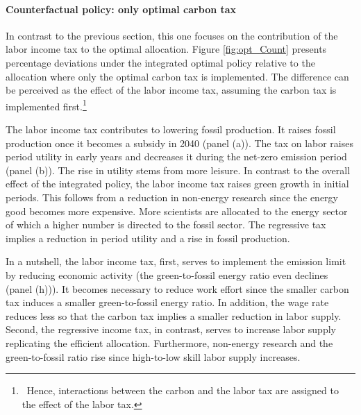 \paragraph{Counterfactual policy: only optimal carbon tax}
In contrast to the previous section, this one focuses on the contribution of the labor income tax to the optimal allocation.
Figure \ref{fig:opt_Count} presents percentage deviations under the integrated optimal policy relative to the allocation where only the optimal carbon tax is implemented. The difference can be perceived as the effect of the labor income tax, assuming the carbon tax is implemented first.\footnote{\ Hence, interactions between the carbon and the labor tax are assigned to the effect of the labor tax.}

 The labor income tax contributes to lowering fossil production. It raises fossil production once it becomes a subsidy in 2040 (panel (a)). The tax on labor raises period utility in early years and decreases it during the net-zero emission period (panel (b)). The rise in utility stems from more leisure. In contrast to the overall effect of the integrated policy, the labor income tax raises green growth in initial periods. This follows from a reduction in non-energy research since the energy good becomes more expensive. More scientists are allocated to the energy sector of which a higher number is directed to the fossil sector.  The regressive tax implies a reduction in period utility and a rise in fossil production.
 
 In a nutshell, the labor income tax, first, serves to implement the emission limit by reducing economic activity (the green-to-fossil energy ratio even declines (panel (h))). It becomes necessary to reduce work effort since the smaller carbon tax induces a smaller green-to-fossil energy ratio. In addition, the wage rate reduces less so that the carbon tax implies a smaller reduction in labor supply. Second, the regressive income tax, in contrast, serves to increase labor supply replicating the efficient allocation. Furthermore, non-energy research and the green-to-fossil ratio rise since high-to-low skill labor supply increases. 
 
   
\clearpage